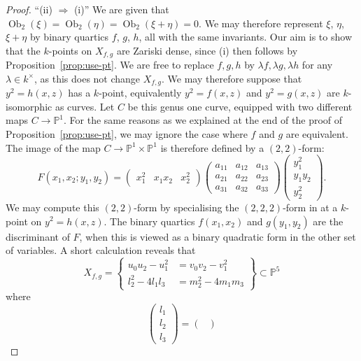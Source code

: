 \documentclass[12pt]{amsart}
\newcommand{\Ob}{\operatorname{Ob}}
\newcommand{\PP}{{\mathbb P}}
\theoremstyle{definition}
\begin{document}
\begin{proof}
  ``(ii) $\Rightarrow$ (i)'' We are given that
  $\Ob_2(\xi) = \Ob_2(\eta) = \Ob_2(\xi + \eta) = 0$. We may therefore
  represent $\xi$, $\eta$, $\xi+\eta$ by binary quartics $f$, $g$,
  $h$, all with the same invariants.  Our aim is to show that the
  $k$-points on $X_{f,g}$ are Zariski dense, since (i) then follows by
  Proposition~\ref{prop:use-pt}.  We are free to replace $f,g,h$ by
  $\lambda f, \lambda g, \lambda h$ for any $\lambda \in k^\times$, as
  this does not change $X_{f,g}$. We may therefore suppose that
  $y^2 = h(x,z)$ has a $k$-point, equivalently $y^2 = f(x,z)$ and
  $y^2 = g(x,z)$ are $k$-isomorphic as curves.  Let $C$ be this genus
  one curve, equipped with two different maps $C \to \PP^1$. For the
  same reasons as we explained at the end of the proof of
  Proposition~\ref{prop:use-pt}, we may ignore the case where $f$ and
  $g$ are equivalent. The image of the map $C \to \PP^1 \times \PP^1$
  is therefore defined by a $(2,2)$-form:
  \begin{equation*}
F(x_1,x_2;y_1,y_2) = \begin{pmatrix} x_1^2 & x_1 x_2 & x_2^2 \end{pmatrix}
\begin{pmatrix} 
a_{11} & a_{12} & a_{13} \\
a_{21} & a_{22} & a_{23} \\
a_{31} & a_{32} & a_{33} 
\end{pmatrix} \begin{pmatrix} y_1^2 \\ y_1y_2 \\ y_2^2 \end{pmatrix}.
\end{equation*}
We may compute this $(2,2)$-form by specialising the $(2,2,2)$-form in
\cite[Theorem~8.2]{bq-ctp} at a $k$-point on $y^2 = h(x,z)$.  The
binary quartics $f(x_1,x_2)$ and $g(y_1,y_2)$ are the discriminant of
$F$, when this is viewed as a binary quadratic form in the other set
of variables.  A short calculation reveals that
\[ X_{f,g} = \left\{ \begin{aligned} u_0 u_2 - u_1^2 &= v_0 v_2 - v_1^2 \\
l_2^2 - 4 l_1 l_3  &= m_2^2 - 4 m_1 m_3 \end{aligned} \right\} \subset \PP^5 \]
where
\[
\begin{pmatrix} l_1 \\ l_2 \\ l_3 \end{pmatrix}
= \begin{pmatrix} 

\end{pmatrix}\]
\end{proof}
\end{document}
